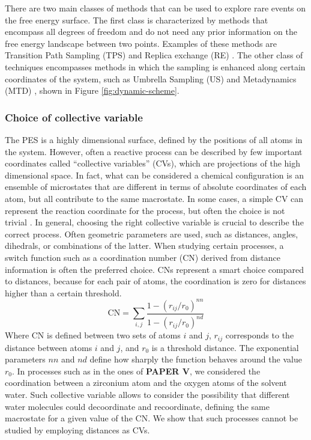 There are two main classes of methods that can be used to explore rare events on the free energy surface. The first class is characterized by methods that encompass all degrees of freedom and do not need any prior information on the free energy landscape between two points. Examples of these methods are Transition Path Sampling (TPS) \cite{dellago2002transition} and Replica exchange (RE) \cite{sugita1999replica}. The other class of techniques encompasses methods in which the sampling is enhanced along certain coordinates of the system, such as Umbrella Sampling (US) \cite{torrie1977nonphysical, patey1975monte} and Metadynamics (MTD) \cite{laio2002escaping}, shown in Figure \ref{fig:dynamic-scheme}.


\subsubsection*{Choice of collective variable}
The PES is a highly dimensional surface, defined by the positions of all atoms in the system. However, often a reactive process can be described by few important coordinates called ``collective variables'' (CVs), which are projections of the high dimensional space. In fact, what can be considered a chemical configuration is an ensemble of microstates that are different in terms of absolute coordinates of each atom, but all contribute to the same macrostate. In some cases, a simple CV can represent the reaction coordinate for the process, but often the choice is not trivial \cite{rohrdanz2013discovering}. In general, choosing the right collective variable is crucial to describe the correct process. Often geometric parameters are used, such as distances, angles, dihedrals, or combinations of the latter. When studying certain processes, a switch function such as a coordination number (CN) derived from distance information is often the preferred choice. CNs represent a smart choice compared to distances, because for each pair of atoms, the coordination is zero for distances higher than a certain threshold.
\[
\mathrm{CN} =\sum_{i,j}\frac{1-(r_{ij}/r_0 )^{nn}}{1-(r_{ij}/r_0 )^{nd}}
\] 
Where CN is defined between two sets of atoms ${i}$ and ${j}$, $r_{ij}$ corresponds to the distance between atoms $i$ and $j$, and $r_0$ is a threshold distance. The exponential parameters $nn$ and $nd$ define how sharply the function behaves around the value $r_0$. In processes such as in the ones of \textbf{PAPER V}, we considered the coordination between a zirconium atom and the oxygen atoms of the solvent water. Such collective variable allows to consider the possibility that different water molecules could decoordinate and recoordinate, defining the same macrostate for a given value of the CN. We show that such processes cannot be studied by employing distances as CVs.

